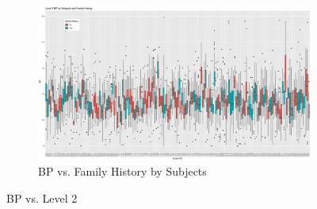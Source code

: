 \documentclass[12pt,twoside,letterpaper]{article}
\theoremstyle{definition}
\theoremstyle{definition}
\newcommand{\detailtexcount}[1]{ %
\immediate\write18{texcount -merge -sum #1.tex > #1.wcdetail }%
%
}
\begin{document}
\begin{appendices}
    \begin{figure}[h] \ContinuedFloat
        \centering
        \begin{subfigure}[b]{\textwidth}
            \centering
            \includegraphics[width=\textwidth]{pics/bp by id and fh.png}
            \caption{BP vs. Family History by Subjects}
            \label{fig: bp v id and fh}
        \end{subfigure}
        \caption{BP vs. Level 2}
        \label{fig: bp v id and level2_3}
    \end{figure}

\end{appendices}

\singlespacing
% 
% 
\printbibliography
\end{document}
